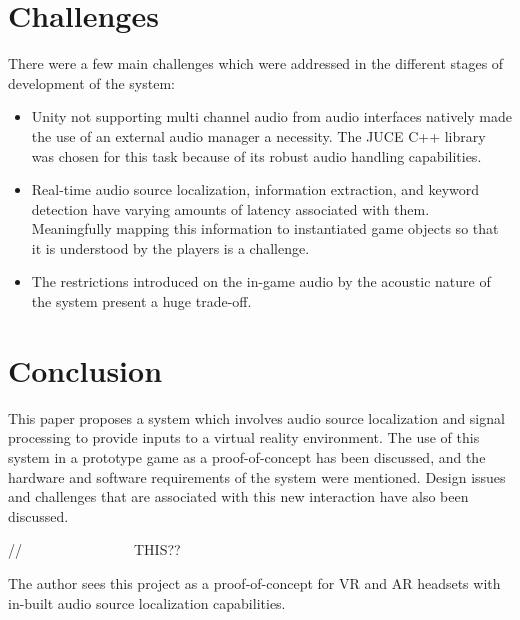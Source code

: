 \documentclass[convention]{aesconf}
\begin{document}
\section{Challenges}
There were a few main challenges which were addressed in the different stages of development of the system: 
\begin{itemize}
\item Unity not supporting multi channel audio from audio interfaces natively made the use of an external audio manager a necessity. The JUCE C++ library was chosen for this task because of its robust audio handling capabilities.
\item Real-time audio source localization, information extraction, and keyword detection have varying amounts of latency associated with them. Meaningfully mapping this information to instantiated game objects so that it is understood by the players is a challenge.
\item The restrictions introduced on the in-game audio by the acoustic nature of the system present a huge trade-off.
\end{itemize}

\section{Conclusion}
This paper proposes a system which involves audio source localization and signal processing to provide inputs to a virtual reality environment. The use of this system in a prototype game as a proof-of-concept has been discussed, and the hardware and software requirements of the system were mentioned. Design issues and challenges that are associated with this new interaction have also been discussed. 


//~~~~~~~~~~~~~~~~THIS??

The author sees this project as a proof-of-concept for VR and AR headsets with in-built audio source localization capabilities.




\end{document}

